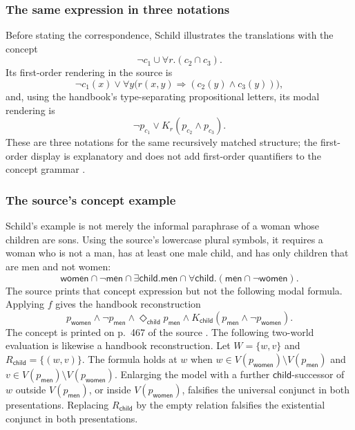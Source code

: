 \subsubsection{The same expression in three notations}

Before stating the correspondence, Schild illustrates the translations with
the concept
\[
 \neg c_1\cup\forall r.(c_2\cap c_3).
\]
Its first-order rendering in the source is
\[
 \neg c_1(x)\lor
 \forall y\bigl(r(x,y)\mathbin{\Rightarrow}
                  (c_2(y)\land c_3(y))\bigr),
\]
and, using the handbook's type-separating propositional letters, its modal
rendering is
\[
 \neg p_{c_1}\lor K_r(p_{c_2}\land p_{c_3}).
\]
These are three notations for the same recursively matched structure; the
first-order display is explanatory and does not add first-order quantifiers to
the concept grammar \cite[p.~467]{Schild1991}.

\subsubsection{The source's concept example}

Schild's example is not merely the informal paraphrase of a woman whose
children are sons.  Using the source's lowercase plural symbols, it requires a
woman who is not a man, has at least one male child, and has only children that
are men and not women:
\[
 \mathsf{women}\cap\neg\mathsf{men}
 \cap\exists\mathsf{child}.\mathsf{men}
 \cap\forall\mathsf{child}.
      (\mathsf{men}\cap\neg\mathsf{women}).
\]
The source prints that concept expression but not the following modal formula.
Applying \(f\) gives the handbook reconstruction
\[
 p_{\mathsf{women}}\land\neg p_{\mathsf{men}}
 \land\Diamond_{\mathsf{child}}p_{\mathsf{men}}
 \land K_{\mathsf{child}}
      (p_{\mathsf{men}}\land\neg p_{\mathsf{women}}).
\]
The concept is printed on p.~467 of the source \cite[p.~467]{Schild1991}.
The following two-world evaluation is likewise a handbook reconstruction.  Let
\(W=\{w,v\}\) and
\(R_{\mathsf{child}}=\{(w,v)\}\).  The formula holds at \(w\) when
\(w\in V(p_{\mathsf{women}})\setminus V(p_{\mathsf{men}})\) and
\(v\in V(p_{\mathsf{men}})\setminus V(p_{\mathsf{women}})\).  Enlarging the
model with a further \(\mathsf{child}\)-successor of \(w\) outside
\(V(p_{\mathsf{men}})\), or inside \(V(p_{\mathsf{women}})\), falsifies the
universal conjunct in both presentations.  Replacing
\(R_{\mathsf{child}}\) by the empty relation falsifies the existential conjunct
in both presentations.

